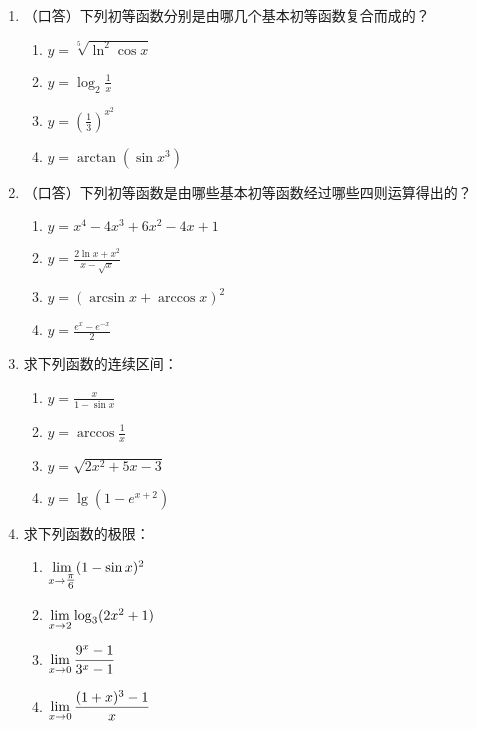 \begin{enumerate}
    \item （口答）下列初等函数分别是由哪几个基本初等函数复合而成的？
\begin{multicols}{2}
  \begin{enumerate}[(1)]
 \item $y=\sqrt[5]{\ln^2\cos x}$
\item $y=\log_2 \frac{1}{x}$   
\item $y=\left(\frac{1}{3}\right)^{x^2}$
\item $y=\arctan(\sin x^3)$
\end{enumerate}  
\end{multicols}

    \item （口答）下列初等函数是由哪些基本初等函数经过哪些四则运算得出的？
\begin{multicols}{2}
\begin{enumerate}[(1)]
    \item $y=x^4-4x^3+6x^2-4x+1$
    \item $y=\frac{2\ln x+x^2}{x-\sqrt{x}}$
    \item $y=(\arcsin x+\arccos x)^2$
    \item $y=\frac{e^x-e^{-x}}{2}$
\end{enumerate}
\end{multicols}
\item 求下列函数的连续区间：
\begin{multicols}{2}
\begin{enumerate}[(1)]
    \item $y=\frac{x}{1-\sin x}$
    \item $y=\arccos\frac{1}{x}$
    \item $y=\sqrt{2x^2+5x-3}$
    \item $y=\lg(1-e^{x+2})$
\end{enumerate}
\end{multicols}

\item 求下列函数的极限：
\begin{multicols}{2}
\begin{enumerate}[(1)]
    \item $\lim\limits_{x\to \tfrac{\pi}{6}}(1-\sin x)^2$
    \item $\lim\limits_{x\to 2}\log_3 (2x^2+1)$
    \item $\lim\limits_{x\to 0}\dfrac{9^x-1}{3^x-1}$
    \item $\lim\limits_{x\to 0}\dfrac{(1+x)^3-1}{x}$
\end{enumerate}
\end{multicols}


\end{enumerate}

